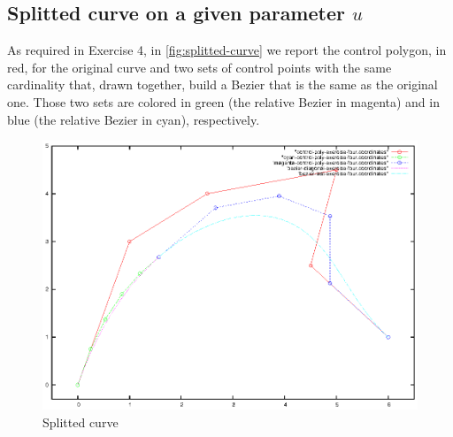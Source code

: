 \documentclass{article}
\begin{document}
\subsection{Splitted curve on a given parameter $u$}
As required in Exercise 4, in \autoref{fig:splitted-curve} we report
the control polygon, in red, for the original curve and two sets of
control points with the same cardinality that, drawn together, build a
Bezier that is the same as the original one. Those two sets are
colored in green (the relative Bezier in magenta) and in blue (the
relative Bezier in cyan), respectively.
\begin{figure}
  \centering
  \includegraphics{bezier-deCasteljau-curves/exercise-four}
  \caption{Splitted curve}
  \label{fig:splitted-curve}
\end{figure}
\end{document}
